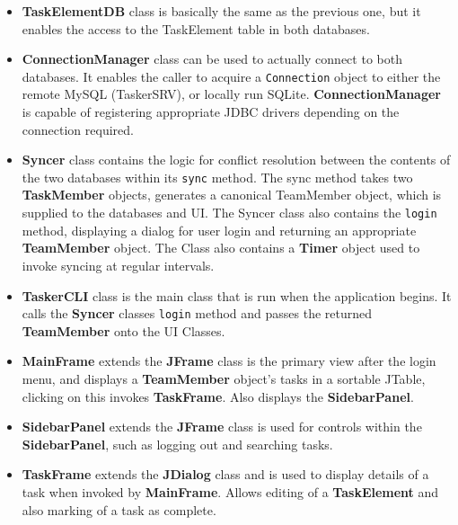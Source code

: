 \begin{itemize}
  		\item \textbf{TaskElementDB} class is basically the same as the previous one, but it enables the access to the TaskElement table in both databases.
  		\item \textbf{ConnectionManager} class can be used to actually connect to both databases. It enables the caller to acquire a \texttt{Connection} object to either the remote MySQL (TaskerSRV), or locally run SQLite. \textbf{ConnectionManager} is capable of registering appropriate JDBC drivers depending on the connection required. 
        \item \textbf{Syncer} class contains the logic for conflict resolution between the contents of the two databases within its \texttt{sync} method. The sync method takes two \textbf{TaskMember} objects, generates a canonical TeamMember object, which is supplied to the databases and UI. The Syncer class also contains the \texttt{login} method, displaying a dialog for user login and returning an appropriate \textbf{TeamMember} object.
        The Class also contains a \textbf{Timer} object used to invoke syncing at regular intervals.
        \item \textbf{TaskerCLI} class is the main class that is run when the application begins. It calls the \textbf{Syncer} classes \texttt{login} method and passes the returned \textbf{TeamMember} onto the UI Classes.
        \item \textbf{MainFrame} extends the \textbf{JFrame} class is the primary view after the login menu, and displays a \textbf{TeamMember} object's tasks in a sortable JTable, clicking on this invokes \textbf{TaskFrame}. Also displays the \textbf{SidebarPanel}.
        \item \textbf{SidebarPanel} extends the \textbf{JFrame} class is used for controls within the \textbf{SidebarPanel}, such as logging out and searching tasks.
        \item \textbf{TaskFrame} extends the \textbf{JDialog} class and is used to display details of a task when invoked by \textbf{MainFrame}. Allows editing of a \textbf{TaskElement} and also marking of a task as complete.
  \end{itemize}
  
  

  

